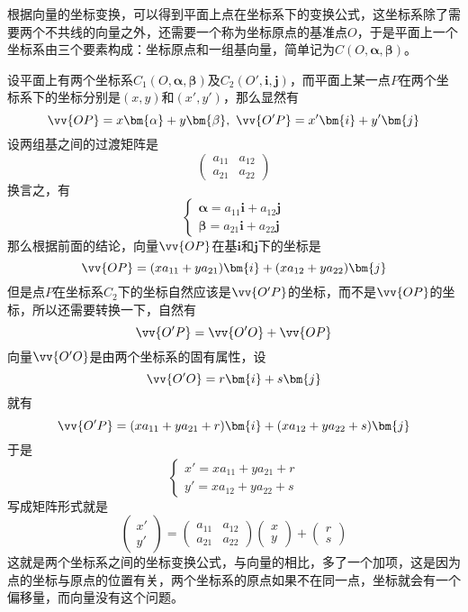     \begin{example}
      根据向量的坐标变换，可以得到平面上点在坐标系下的变换公式，这坐标系除了需要两个不共线的向量之外，还需要一个称为坐标原点的基准点$O$，于是平面上一个坐标系由三个要素构成：坐标原点和一组基向量，简单记为$C(O,\bm{\alpha},\bm{\beta})$。

      设平面上有两个坐标系$C_1(O,\bm{\alpha},\bm{\beta})$及$C_2(O',\bm{i},\bm{j})$，而平面上某一点$P$在两个坐标系下的坐标分别是$(x,y)$和$(x',y')$，那么显然有
      \[ \vv{OP}=x\bm{\alpha}+y\bm{\beta},\  \vv{O'P}=x'\bm{i}+y'\bm{j} \]
      设两组基之间的过渡矩阵是
      \[
    \begin{pmatrix}
      a_{11} & a_{12} \\
      a_{21} & a_{22}
    \end{pmatrix}
        \]
     换言之，有
\[
  \begin{cases}
    \bm{\alpha}=a_{11}\bm{i}+a_{12}\bm{j} \\
    \bm{\beta}=a_{21}\bm{i}+a_{22}\bm{j}
    \end{cases}
\]
那么根据前面的结论，向量$\vv{OP}$在基$\bm{i}$和$\bm{j}$下的坐标是
\[ \vv{OP} = (xa_{11}+ya_{21})\bm{i} + (xa_{12}+ya_{22})\bm{j} \]
但是点$P$在坐标系$C_2$下的坐标自然应该是$\vv{O'P}$的坐标，而不是$\vv{OP}$的坐标，所以还需要转换一下，自然有
\[ \vv{O'P}=\vv{O'O}+\vv{OP} \]
向量$\vv{O'O}$是由两个坐标系的固有属性，设
\[ \vv{O'O} = r \bm{i}+s\bm{j} \]
就有
\[ \vv{O'P} = (xa_{11}+ya_{21}+r)\bm{i} + (xa_{12}+ya_{22}+s)\bm{j} \]
于是
\[
  \begin{cases}
    x' = xa_{11}+ya_{21}+r \\
    y' = xa_{12}+ya_{22}+s
  \end{cases}
\]
写成矩阵形式就是
\[
  \begin{pmatrix}
    x' \\
    y'
  \end{pmatrix}
  =
  \begin{pmatrix}
    a_{11} & a_{12} \\
    a_{21} & a_{22}
  \end{pmatrix}
  \begin{pmatrix}
    x \\
    y
  \end{pmatrix}
  +
  \begin{pmatrix}
    r \\
    s
  \end{pmatrix}
  \]
  这就是两个坐标系之间的坐标变换公式，与向量的相比，多了一个加项，这是因为点的坐标与原点的位置有关，两个坐标系的原点如果不在同一点，坐标就会有一个偏移量，而向量没有这个问题。
    \end{example}


